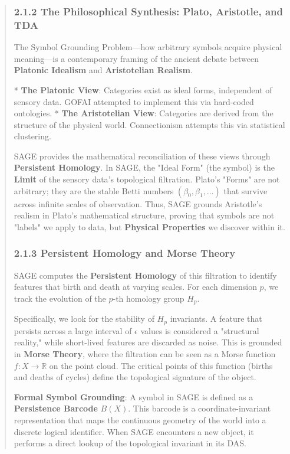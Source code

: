 \documentclass[10pt,twocolumn,letterpaper]{article}
\begin{document}
\begin{abstract}
\subsubsection{2.1.2 The Philosophical Synthesis: Plato, Aristotle, and TDA}
The Symbol Grounding Problem—how arbitrary symbols acquire physical meaning—is a contemporary framing of the ancient debate between \textbf{Platonic Idealism} and \textbf{Aristotelian Realism}. 

*   \textbf{The Platonic View}: Categories exist as ideal forms, independent of sensory data. GOFAI attempted to implement this via hard-coded ontologies.
*   \textbf{The Aristotelian View}: Categories are derived from the structure of the physical world. Connectionism attempts this via statistical clustering.

SAGE provides the mathematical reconciliation of these views through \textbf{Persistent Homology}. In SAGE, the "Ideal Form" (the symbol) is the \textbf{Limit} of the sensory data's topological filtration. Plato’s "Forms" are not arbitrary; they are the stable Betti numbers $(\beta_0, \beta_1, \dots)$ that survive across infinite scales of observation. Thus, SAGE grounds Aristotle's realism in Plato's mathematical structure, proving that symbols are not "labels" we apply to data, but \textbf{Physical Properties} we discover within it.

\subsubsection{2.1.3 Persistent Homology and Morse Theory}
SAGE computes the \textbf{Persistent Homology} of this filtration to identify features that birth and death at varying scales. For each dimension $p$, we track the evolution of the $p$-th homology group $H_p$. 

Specifically, we look for the stability of $H_p$ invariants. A feature that persists across a large interval of $\epsilon$ values is considered a "structural reality," while short-lived features are discarded as noise. This is grounded in \textbf{Morse Theory}, where the filtration can be seen as a Morse function $f: X \to \mathbb{R}$ on the point cloud. The critical points of this function (births and deaths of cycles) define the topological signature of the object.

\textbf{Formal Symbol Grounding}: A symbol in SAGE is defined as a \textbf{Persistence Barcode} $B(X)$. This barcode is a coordinate-invariant representation that maps the continuous geometry of the world into a discrete logical identifier. When SAGE encounters a new object, it performs a direct lookup of the topological invariant in its DAS.


\end{abstract}
\end{document}
